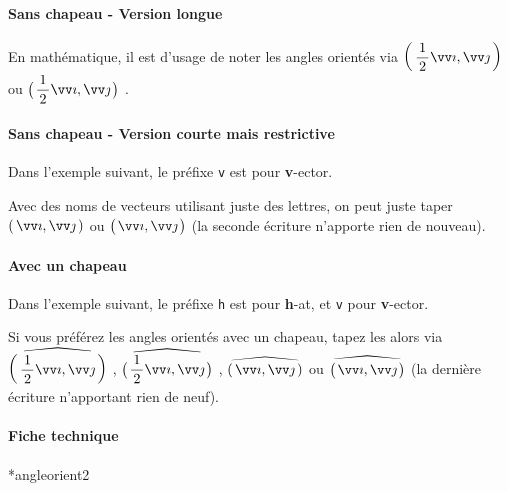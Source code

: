 \documentclass[12pt,a4paper]{article}
\makeatletter
\theoremstyle{definition}
\newcommand\IDmacro{\@ifstar{\@IDmacro@star}{\@IDmacro@no@star}}
\newcommand\@IDmacro@no@star[3]{%
    \texttt{%
    	\textbackslash#1%
    	\IfStrEq{#2}{0}{}{%
    		\,\,[#2 Option%
				\IfStrEq{#2}{1}{}{s}]%
			}%
	    \IfStrEq{#3}{}{}{%
	    		\,\,(#3 Argument%
				\IfStrEq{#3}{1}{}{s})%
			}
	   	}
    \immediate\write\tempfile{macro,#1,#2,#3}%
}
\newcommand\@IDmacro@star[2]{%
    \@IDmacro@no@star{#1}{0}{#2}%
}
\makeatother
\begin{document}
            \paragraph{Sans chapeau - Version longue}

\begin{tcblisting}{}
En mathématique, il est d'usage de noter les angles orientés via
$\displaystyle \angleorient{\frac{1}{2} \vect{i}}{\vect{j}}$
ou
$\displaystyle \angleorient*{\frac{1}{2} \vect{i}}{\vect{j}}$ .
\end{tcblisting}



            \paragraph{Sans chapeau - Version courte mais restrictive}

Dans l'exemple suivant, le préfixe \verb+v+ est pour \textbf{v}-ector.
\begin{tcblisting}{}
Avec des noms de vecteurs utilisant juste des lettres, on peut juste taper
$\displaystyle \vangleorient{i}{j}$
ou
$\displaystyle \vangleorient*{i}{j}$ (la seconde écriture n'apporte rien de nouveau).
\end{tcblisting}



            \paragraph{Avec un chapeau}

Dans l'exemple suivant, le préfixe \verb+h+ est pour \textbf{h}-at, et \verb+v+ pour \textbf{v}-ector.

\begin{tcblisting}{}
Si vous préférez les angles orientés avec un chapeau, tapez les alors via
$\displaystyle \hangleorient{\frac{1}{2} \vect{i}}{\vect{j}}$ ,
$\displaystyle \hangleorient*{\frac{1}{2} \vect{i}}{\vect{j}}$ ,
$\displaystyle \hvangleorient{i}{j}$
ou
$\displaystyle \hvangleorient*{i}{j}$ (la dernière écriture n'apportant rien de neuf).
\end{tcblisting}



            \paragraph{Fiche technique}

\IDmacro*{angleorient}{2}
\end{document}
